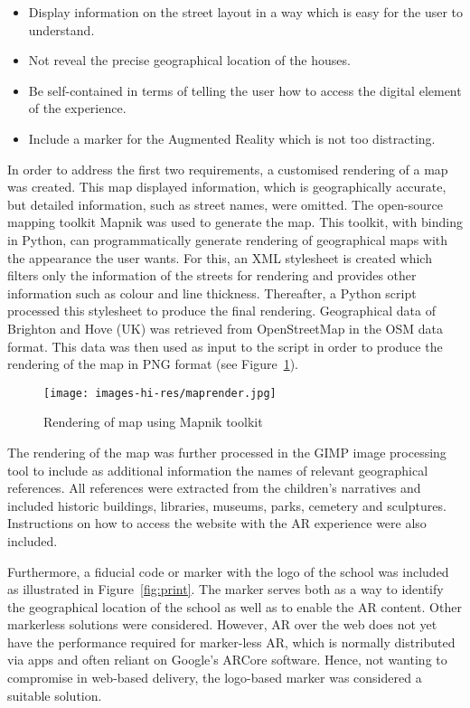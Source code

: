 \documentclass{egpubl}
\begin{document}
\begin{itemize} 
  \item Display information on the street layout in a way which is easy for the user to understand. 
  \item Not reveal the precise geographical location of the houses. 
  \item Be self-contained in terms of telling the user how to access 
  the digital element of the experience. 
  \item Include a marker for the Augmented Reality which is not too distracting. 
\end{itemize}

In order to address the first two requirements, a customised rendering of a
map was created. This map displayed information, which is geographically
accurate, but detailed information, such as street names, were omitted. The
open-source mapping toolkit Mapnik \cite{mapnik} was used to generate the map.
This toolkit, with binding in Python, can programmatically generate rendering
of geographical maps with the appearance the user wants. For this, an XML
stylesheet is created which filters only the information of the streets for
rendering and provides other information such as colour and line thickness.
Thereafter, a Python script processed this stylesheet to produce the final
rendering. Geographical data of Brighton and Hove (UK) was retrieved from OpenStreetMap
\cite{OpenStreetMap} in the OSM data format. This data was then used as input
to the script in order to produce the rendering of the map in PNG format (see
Figure~\ref{fig:map}).


\begin{figure}[ht] \centering
\texttt{[image: images-hi-res/maprender.jpg]}
\caption{Rendering of map using Mapnik toolkit} \label{fig:map} \end{figure}
 
The rendering of the map was further processed in the GIMP image processing
tool \cite{gimp} to include as additional information the names of relevant
geographical references. All references were extracted from the children's
narratives and included historic buildings, libraries, museums, parks,
cemetery and sculptures. Instructions on how to access the website with the AR
experience were also included.

Furthermore, a fiducial code or marker with the logo of the school was
included as illustrated in Figure~\ref{fig:print}. The marker serves both as a
way to identify the geographical location of the school as well as to enable
the AR content. Other markerless solutions were considered. However, AR over
the web does not yet have the performance required for marker-less AR, which
is normally distributed via apps and often reliant on Google's ARCore
software. Hence, not wanting to compromise in web-based delivery, the
logo-based marker was considered a suitable solution.
\end{document}
